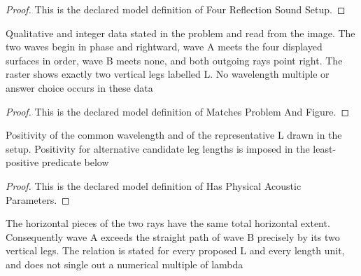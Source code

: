 \begin{proof}
  This is the declared model definition of Four Reflection Sound Setup.
\end{proof}
\begin{definition}
  \label{def:physics:phyx-mini-0322:phyxminiproblems-problemphyxmini0322-matchesproblemandfigure}
  Qualitative and integer data stated in the problem and read from the image. The two waves begin in phase and rightward, wave A meets the four displayed surfaces in order, wave B meets none, and both outgoing rays point right. The raster shows exactly two vertical legs labelled L. No wavelength multiple or answer choice occurs in these data
\end{definition}
\begin{proof}
  This is the declared model definition of Matches Problem And Figure.
\end{proof}
\begin{definition}
  \label{def:physics:phyx-mini-0322:phyxminiproblems-problemphyxmini0322-hasphysicalacousticparameters}
  Positivity of the common wavelength and of the representative L drawn in the setup. Positivity for alternative candidate leg lengths is imposed in the least-positive predicate below
\end{definition}
\begin{proof}
  This is the declared model definition of Has Physical Acoustic Parameters.
\end{proof}
\begin{definition}
  \label{def:physics:phyx-mini-0322:phyxminiproblems-problemphyxmini0322-satisfiesdepictedpathgeometry}
  The horizontal pieces of the two rays have the same total horizontal extent. Consequently wave A exceeds the straight path of wave B precisely by its two vertical legs. The relation is stated for every proposed L and every length unit, and does not single out a numerical multiple of lambda
\end{definition}
